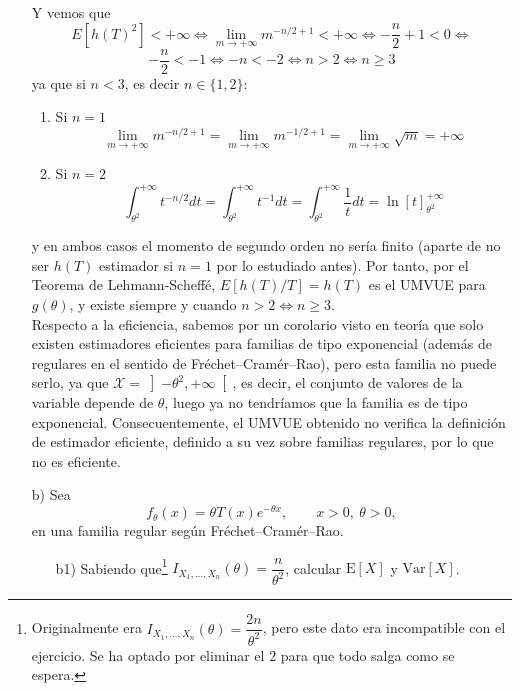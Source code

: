 \documentclass[12pt]{article}
\newcommand{\X}{\mathcal{X}}
\begin{document}
\begin{ejercicio}
\begin{enumerate}
            Y vemos que $$E[h(T)^2] < + \infty \iff \lim\limits_{m \to +\infty} m^{-n/2+1} < +\infty \iff
            -\dfrac{n}{2} + 1 < 0 \iff$$$$ -\dfrac{n}{2} < -1 \iff
            -n < -2 \iff n > 2 \iff n \geq 3$$ ya que si $n < 3$, es decir $n \in \{1,2\}$:
            \begin{enumerate}
                \item Si $n=1$
                $$\lim\limits_{m \to +\infty} m^{-n/2+1} = \lim\limits_{m \to +\infty} m^{-1/2+1} = 
                \lim\limits_{m \to +\infty} \sqrt{m} = + \infty$$
                \item Si $n=2$
                $$\int_{\theta^2}^{+\infty} t^{-n/2} dt = \int_{\theta^2}^{+\infty} t^{-1} dt = 
            \int_{\theta^2}^{+\infty} \dfrac{1}{t} dt = \ln[t]_{\theta^2}^{+\infty}$$
            \end{enumerate} 
            y en ambos casos el momento de segundo orden no sería finito (aparte de no ser $h(T)$ estimador si $n=1$ por lo estudiado
            antes). Por tanto, por el Teorema de Lehmann-Scheffé, $E[h(T)/T] = h(T)$ es el UMVUE para $g(\theta)$, y existe siempre y
            cuando $n>2 \iff n \geq 3$. \\

            Respecto a la eficiencia, sabemos por un corolario visto en teoría que solo existen estimadores eficientes para familias
            de tipo exponencial (además de regulares en el sentido de Fréchet--Cramér--Rao), pero esta familia no puede serlo, 
            ya que $\X = \left]-\theta^2, +\infty \right[$, es decir, el conjunto de valores de la variable depende de $\theta$,
            luego ya no tendríamos que la familia es de tipo exponencial. Consecuentemente, el UMVUE obtenido 
            no verifica la definición de estimador eficiente, definido a su vez sobre familias regulares, por lo que 
            no es eficiente.


            \item[b)] Sea $$ f_\theta(x)=\theta T(x)e^{-\theta x}, \qquad x>0,\ \theta>0,$$
            en una familia regular según Fréchet--Cramér--Rao.
            \begin{enumerate}
                \item[b1)] Sabiendo que\footnote{Originalmente era $I_{X_1,\dots,X_n}(\theta)=\dfrac{2n}{\theta^2}$, pero este dato era incompatible
                con el ejercicio. Se ha optado por eliminar el $2$ para que todo salga como se espera.} $I_{X_1,\dots,X_n}(\theta)=\dfrac{n}{\theta^2}$, calcular
                $\mathrm{E}[X]$ y $\mathrm{Var}[X]$. \\


\end{enumerate}
\end{enumerate}
\end{ejercicio}
\end{document}

